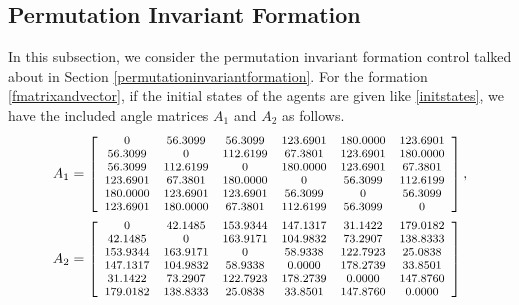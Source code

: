 \documentclass[11pt, a4paper, oneside, openany, reqno]{book}
\theoremstyle{definition}
\theoremstyle{remark}
\numberwithin{equation}{chapter} %
\begin{document}
\subsection{Permutation Invariant Formation}
In this subsection, 
we consider the permutation invariant formation control 
talked about in Section \ref{permutationinvariantformation}.
For the formation \eqref{fmatrixandvector}, 
if the initial states of the agents are given like \eqref{initstates},
we have the included angle matrices $ A_1 $ and $ A_2 $ as follows.
\begin{equation}\begin{split}
	A_1&=\begin{footnotesize} \left[ \begin{array}{cccccc } 
         0&   56.3099&   56.3099&  123.6901&  180.0000&  123.6901\\
   56.3099&         0&  112.6199&   67.3801&  123.6901&  180.0000\\
   56.3099&  112.6199&         0&  180.0000&  123.6901&   67.3801\\
  123.6901&   67.3801&  180.0000&         0&   56.3099&  112.6199\\
  180.0000&  123.6901&  123.6901&   56.3099&         0&   56.3099\\
  123.6901&  180.0000&   67.3801&  112.6199&   56.3099&         0\\  
	\end{array} \right]\end{footnotesize}, \\
	A_2&=\begin{footnotesize}\left[ \begin{array}{cccccc } 
         0&   42.1485&  153.9344&  147.1317&   31.1422&  179.0182\\
   42.1485&         0&  163.9171&  104.9832&   73.2907&  138.8333\\
  153.9344&  163.9171&         0&   58.9338&  122.7923&   25.0838\\
  147.1317&  104.9832&   58.9338&    0.0000&  178.2739&   33.8501\\
   31.1422&   73.2907&  122.7923&  178.2739&    0.0000&  147.8760\\
  179.0182&  138.8333&   25.0838&   33.8501&  147.8760&    0.0000\\
	\end{array} \right]\end{footnotesize}
\end{split}\end{equation}
\end{document}
